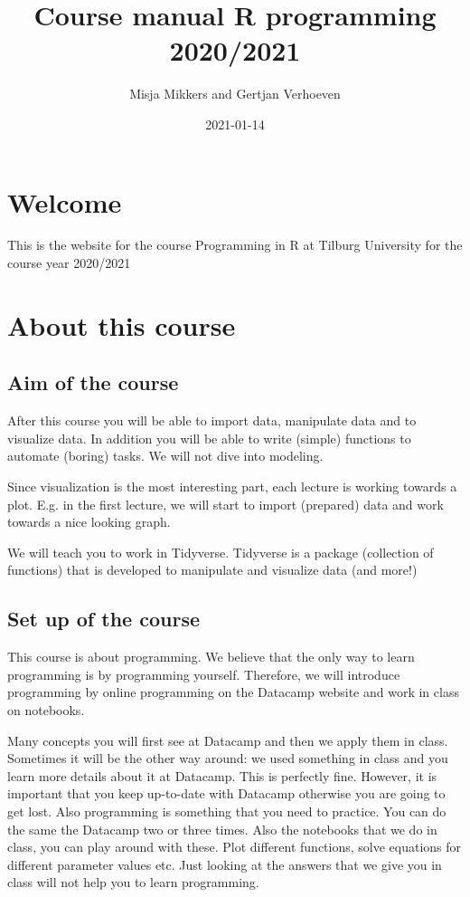 \documentclass[
]{book}
\title{Course manual R programming 2020/2021}
\author{Misja Mikkers and Gertjan Verhoeven}
\date{2021-01-14}
\begin{document}
\maketitle

{
\setcounter{tocdepth}{1}
\tableofcontents
}
\hypertarget{welcome}{%
\chapter*{Welcome}\label{welcome}}

This is the website for the course Programming in R at Tilburg University for the course year 2020/2021

\hypertarget{about-this-course}{%
\chapter{About this course}\label{about-this-course}}

\hypertarget{aim-of-the-course}{%
\section{Aim of the course}\label{aim-of-the-course}}

After this course you will be able to import data, manipulate data and to visualize data. In addition you will be able to write (simple) functions to automate (boring) tasks. We will not dive into modeling.

Since visualization is the most interesting part, each lecture is working towards a plot. E.g. in the first lecture, we will start to import (prepared) data and work towards a nice looking graph.

We will teach you to work in Tidyverse. Tidyverse is a package (collection of functions) that is developed to manipulate and visualize data (and more!)

\hypertarget{set-up-of-the-course}{%
\section{Set up of the course}\label{set-up-of-the-course}}

This course is about programming. We believe that the only way to learn programming is by programming yourself. Therefore, we will introduce programming by online programming on the Datacamp website and work in class on notebooks.

Many concepts you will first see at Datacamp and then we apply them in class. Sometimes it will be the other way around: we used something in class and you learn more details about it at Datacamp. This is perfectly fine. However, it is important that you keep up-to-date with Datacamp otherwise you are going to get lost. Also programming is something that you need to practice. You can do the same the Datacamp two or three times. Also the notebooks that we do in class, you can play around with these. Plot different functions, solve equations for different parameter values etc. Just looking at the answers that we give you in class will not help you to learn programming.
\end{document}
